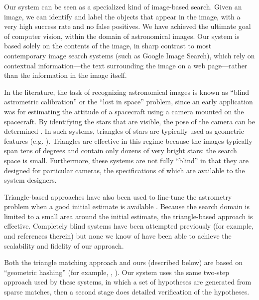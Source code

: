 

Our system can be seen as a specialized kind of image-based search.
Given an image, we can identify and label the objects that appear in
the image, with a very high success rate and no false positives.  We
have achieved the ultimate goal of computer vision, within the domain
of astronomical images.  Our system is based solely on the contents of
the image, in sharp contrast to most contemporary image search systems
(such as Google Image Search), which rely on contextual
information---the text surrounding the image on a web page---rather
than the information in the image itself.





In the literature, the task of recognizing astronomical images is
known as ``blind astrometric calibration'' or the ``lost in space''
problem, since an early application was for estimating the attitude of
a spacecraft using a camera mounted on the spacecraft.  By identifying
the stars that are visible, the pose of the camera can be determined
\cite{liebe1993}.  In such systems, triangles of stars are typically
used as geometric features (e.g. \cite{junkins1977}).  Triangles are
effective in this regime because the images typically span tens of
degrees and contain only dozens of very bright stars: the search space
is small.  Furthermore, these systems are not fully ``blind'' in that
they are designed for particular cameras, the specifications of which
are available to the system designers.


Triangle-based approaches have also been used to fine-tune the astrometry
problem when a good initial estimate is available \cite{pal2006}.
Because the search domain is limited to a small area around the
initial estimate, the triangle-based approach is effective.
Completely blind systems have been attempted previously (for example,
\cite{harvey2004} and references therein) but none we know of have been
able to achieve the scalability and fidelity of our approach.


Both the triangle matching approach and ours (described below) are
based on ``geometric hashing'' (for example, \cite{lamdan1990},
\cite{huttenlocher1990}).  Our system uses the same two-step
approach used by these systems, in which a set of hypotheses are
generated from sparse matches, then a second stage does detailed
verification of the hypotheses.



